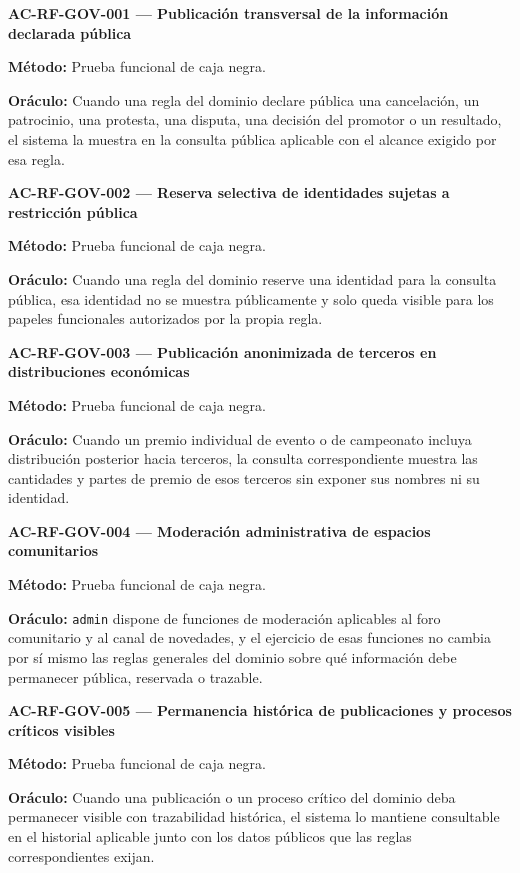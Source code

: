 \documentclass[10pt,letterpaper]{article}
\begin{document}
\noindent\textbf{AC-RF-GOV-001 --- Publicación transversal de la información declarada pública}\par
\textbf{Método:} Prueba funcional de caja negra.\par
\textbf{Oráculo:} Cuando una regla del dominio declare pública una cancelación, un patrocinio, una protesta, una disputa, una decisión del promotor o un resultado, el sistema la muestra en la consulta pública aplicable con el alcance exigido por esa regla.\par\vspace{0.45em}
\noindent\textbf{AC-RF-GOV-002 --- Reserva selectiva de identidades sujetas a restricción pública}\par
\textbf{Método:} Prueba funcional de caja negra.\par
\textbf{Oráculo:} Cuando una regla del dominio reserve una identidad para la consulta pública, esa identidad no se muestra públicamente y solo queda visible para los papeles funcionales autorizados por la propia regla.\par\vspace{0.45em}
\noindent\textbf{AC-RF-GOV-003 --- Publicación anonimizada de terceros en distribuciones económicas}\par
\textbf{Método:} Prueba funcional de caja negra.\par
\textbf{Oráculo:} Cuando un premio individual de evento o de campeonato incluya distribución posterior hacia terceros, la consulta correspondiente muestra las cantidades y partes de premio de esos terceros sin exponer sus nombres ni su identidad.\par\vspace{0.45em}
\noindent\textbf{AC-RF-GOV-004 --- Moderación administrativa de espacios comunitarios}\par
\textbf{Método:} Prueba funcional de caja negra.\par
\textbf{Oráculo:} \texttt{admin} dispone de funciones de moderación aplicables al foro comunitario y al canal de novedades, y el ejercicio de esas funciones no cambia por sí mismo las reglas generales del dominio sobre qué información debe permanecer pública, reservada o trazable.\par\vspace{0.45em}
\noindent\textbf{AC-RF-GOV-005 --- Permanencia histórica de publicaciones y procesos críticos visibles}\par
\textbf{Método:} Prueba funcional de caja negra.\par
\textbf{Oráculo:} Cuando una publicación o un proceso crítico del dominio deba permanecer visible con trazabilidad histórica, el sistema lo mantiene consultable en el historial aplicable junto con los datos públicos que las reglas correspondientes exijan.\par\vspace{0.45em}
\end{document}
